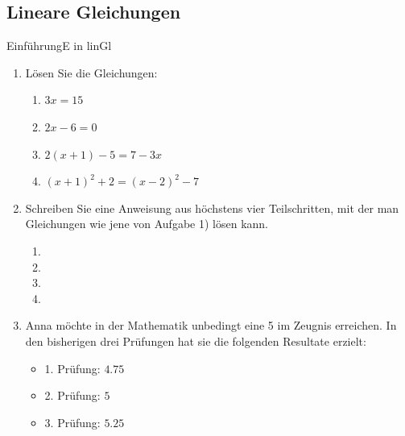 \subsection{Lineare Gleichungen}
\begin{LA}
    {Einführung}{E in linGl}
    \begin{enumerate}
        \item Lösen Sie die Gleichungen:
              \begin{enumerate}
                  \item \(3x=15\)\vspace{2cm}
                  \item \(2x-6=0\)\vspace{2cm}
                  \item \(2(x+1)-5=7-3x\) \vspace{4cm}
                  \item \((x+1)^2+2=(x-2)^2-7\)
              \end{enumerate}
              \clearpage
        \item Schreiben Sie eine Anweisung aus höchstens vier Teilschritten, mit der man Gleichungen wie jene von Aufgabe 1) lösen kann.

              \begin{enumerate}
                  \item[1. Schritt:] \vspace{1.2cm}
                  \item[2. Schritt:] \vspace{1.2cm}
                  \item[3. Schritt:] \vspace{1.2cm}
                  \item[4. Schritt:] \vspace{1.2cm}
              \end{enumerate}
              \vspace{1.2cm}
        \item Anna möchte in der Mathematik unbedingt eine 5 im Zeugnis erreichen. In den bisherigen drei Prüfungen hat sie die folgenden Resultate erzielt:
              \begin{itemize}
                  \item 1. Prüfung: \(4.75\)
                  \item 2. Prüfung: \(5\)
                  \item 3. Prüfung: \(5.25\)
              \end{itemize}


\end{enumerate}
\end{LA}

